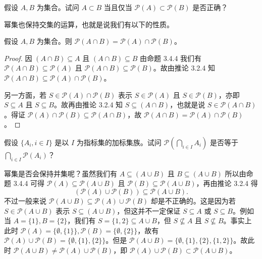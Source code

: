 \begin{question}
假设 $A, B$ 为集合。试问 $A \subset B$ 当且仅当 $\mathcal{P}(A) \subset \mathcal{P}(B)$ 是否正确？
\end{question}

幂集也保持交集的运算，也就是说我们有以下的性质。

\begin{proposition}
假设 $A, B$ 为集合。则 $\mathcal{P}(A \cap B) = \mathcal{P}(A) \cap \mathcal{P}(B)$。
\end{proposition}

\begin{proof}
因 $(A \cap B) \subseteq A$ 且 $(A \cap B) \subseteq B$ 由命题 3.4.4 我们有 $\mathcal{P}(A \cap B) \subseteq \mathcal{P}(A)$ 且 $\mathcal{P}(A \cap B) \subseteq \mathcal{P}(B)$。故由推论 3.2.4 知 $\mathcal{P}(A \cap B) \subseteq \mathcal{P}(A) \cap \mathcal{P}(B)$。

另一方面，若 $S \in \mathcal{P}(A) \cap \mathcal{P}(B)$ 表示 $S \in \mathcal{P}(A)$ 且 $S \in \mathcal{P}(B)$，亦即 $S \subseteq A$ 且 $S \subseteq B$。故再由推论 3.2.4 知 $S \subseteq (A \cap B)$，也就是说 $S \in \mathcal{P}(A \cap B)$。得证 $\mathcal{P}(A) \cap \mathcal{P}(B) \subseteq \mathcal{P}(A \cap B)$，故 $\mathcal{P}(A \cap B) = \mathcal{P}(A) \cap \mathcal{P}(B)$。
\end{proof}

\begin{question}
假设 $\{A_i, i \in I\}$ 是以 $I$ 为指标集的加标集族。试问 $\mathcal{P}(\bigcap_{i \in I} A_i)$ 是否等于 $\bigcap_{i \in I} \mathcal{P}(A_i)$？
\end{question}

幂集是否会保持并集呢？虽然我们有 $A \subseteq (A \cup B)$ 且 $B \subseteq (A \cup B)$ 所以由命题 3.4.4 可得 $\mathcal{P}(A) \subseteq \mathcal{P}(A \cup B)$ 且 $\mathcal{P}(B) \subseteq \mathcal{P}(A \cup B)$，再由推论 3.2.4 得
\begin{equation}
(\mathcal{P}(A) \cup \mathcal{P}(B)) \subseteq \mathcal{P}(A \cup B).
\end{equation}
不过一般来说 $\mathcal{P}(A \cup B) \subseteq \mathcal{P}(A) \cup \mathcal{P}(B)$ 却是不正确的。这是因为若 $S \in \mathcal{P}(A \cup B)$ 表示 $S \subseteq (A \cup B)$，但这并不一定保证 $S \subseteq A$ 或 $S \subseteq B$。例如当 $A = \{1\}, B = \{2\}$，我们有 $S = \{1, 2\} \subseteq A \cup B$，但 $S \nsubseteq A$ 且 $S \nsubseteq B$。事实上此时 $\mathcal{P}(A) = \{\emptyset, \{1\}\}, \mathcal{P}(B) = \{\emptyset, \{2\}\}$，故有 $\mathcal{P}(A) \cup \mathcal{P}(B) = \{\emptyset, \{1\}, \{2\}\}$。但是 $\mathcal{P}(A \cup B) = \{\emptyset, \{1\}, \{2\}, \{1, 2\}\}$。故此时 $\mathcal{P}(A \cup B) \neq \mathcal{P}(A) \cup \mathcal{P}(B)$，即 $\mathcal{P}(A) \cup \mathcal{P}(B) \subset \mathcal{P}(A \cup B)$。

